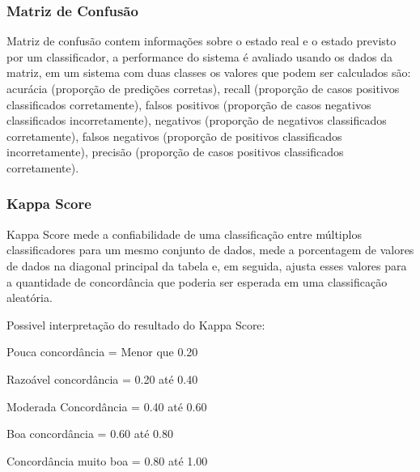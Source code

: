 \documentclass[12pt]{article}
\begin{document}
	\subsubsection{Matriz de Confusão}
	
		Matriz de confusão contem informações sobre o estado real e o estado previsto por um classificador, a performance do sistema é avaliado usando os dados da matriz, em um sistema com duas classes os valores que podem ser calculados são: acurácia (proporção de predições corretas), recall (proporção de casos positivos classificados corretamente), falsos positivos (proporção de casos negativos classificados incorretamente), negativos (proporção de negativos classificados corretamente), falsos negativos (proporção de positivos classificados incorretamente), precisão (proporção de casos positivos classificados corretamente).
		
	\subsubsection{Kappa Score}
	
	Kappa Score mede a confiabilidade de uma classificação entre múltiplos classificadores para um mesmo conjunto de dados, mede a porcentagem de valores de dados na diagonal principal da tabela e, em seguida, ajusta esses valores para a quantidade de concordância que poderia ser esperada em uma classificação aleatória.
	
	Possivel interpretação do resultado do Kappa Score:
	
	Pouca concordância = Menor que 0.20
	
	Razoável concordância = 0.20 até 0.40
	
	Moderada Concordância = 0.40 até 0.60
	
	Boa concordância = 0.60 até 0.80
	
	Concordância muito boa = 0.80 até 1.00	
		
\end{document}
